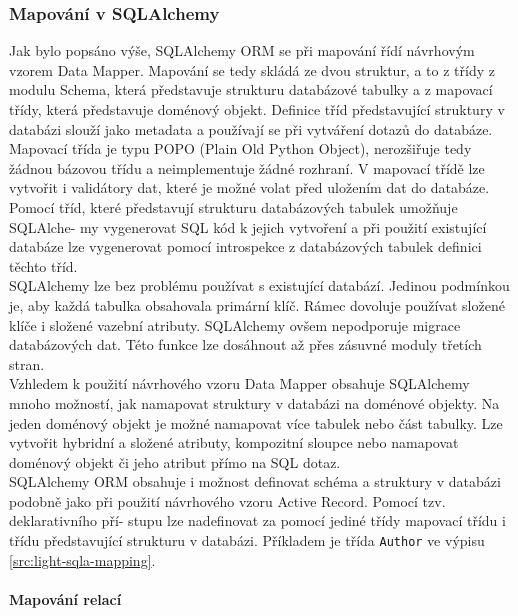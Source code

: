 \documentclass[ing,male,java,dept456]{diploma}						%
\begin{document}
\subsubsection{Mapování v SQLAlchemy}

Jak bylo popsáno výše, SQLAlchemy ORM se při mapování řídí návrhovým vzorem Data Mapper. Mapování se tedy skládá ze dvou struktur, a to z třídy z modulu Schema, která představuje strukturu databázové tabulky a z mapovací třídy, která představuje doménový objekt. Definice tříd představující struktury v databázi slouží jako metadata a používají se při vytváření dotazů do databáze. Mapovací třída je typu POPO (Plain Old Python Object), nerozšiřuje tedy žádnou bázovou třídu a neimplementuje žádné rozhraní. V mapovací třídě lze vytvořit i validátory dat, které je možné volat před uložením dat do databáze. \\
Pomocí tříd, které představují strukturu databázových tabulek umožňuje SQLAlche- my vygenerovat SQL kód k jejich vytvoření a při použití existující databáze lze vygenerovat pomocí introspekce z databázových tabulek definici těchto tříd. \\
SQLAlchemy lze bez problému používat s existující databází. Jedinou podmínkou je, aby každá tabulka obsahovala primární klíč. Rámec dovoluje používat složené klíče i složené vazební atributy. SQLAlchemy ovšem nepodporuje migrace databázových dat. Této funkce lze dosáhnout až přes zásuvné moduly třetích stran. \\
Vzhledem k použití návrhového vzoru Data Mapper obsahuje SQLAlchemy mnoho možností, jak namapovat struktury v databázi na doménové objekty. Na jeden doménový objekt je možné namapovat více tabulek nebo část tabulky. Lze vytvořit hybridní a složené atributy, kompozitní sloupce nebo namapovat doménový objekt či jeho atribut přímo na SQL dotaz. \\
SQLAlchemy ORM obsahuje i možnost definovat schéma a struktury v databázi podobně jako při použití návrhového vzoru Active Record. Pomocí tzv. deklarativního pří- stupu lze nadefinovat za pomocí jediné třídy mapovací třídu i třídu představující strukturu v databázi. Příkladem je třída \lstinline[style=inlinepython]|Author| ve výpisu \ref{src:light-sqla-mapping}.

\paragraph{Mapování relací}
\end{document}
